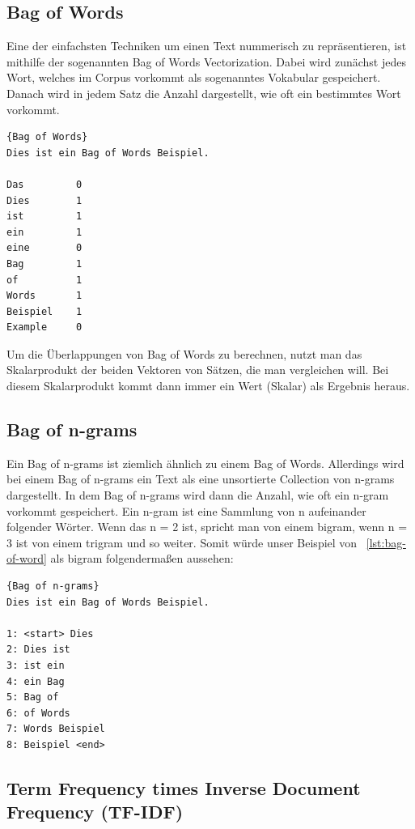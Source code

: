 \subsection{Bag of Words}

Eine der einfachsten Techniken um einen Text nummerisch zu repräsentieren, ist mithilfe der sogenannten Bag of Words Vectorization.
Dabei wird zunächst jedes Wort, welches im Corpus vorkommt als sogenanntes Vokabular gespeichert.
Danach wird in jedem Satz die Anzahl dargestellt, wie oft ein bestimmtes Wort vorkommt.\cite{textAnalysisMonkeylearn}

\begin{lstlisting}[label={lst:bag-of-word},caption={Bag of Words}]{Bag of Words}
Dies ist ein Bag of Words Beispiel.

Das         0
Dies        1
ist         1
ein         1
eine        0
Bag         1
of          1
Words       1
Beispiel    1
Example     0
\end{lstlisting}

Um die Überlappungen von Bag of Words zu berechnen, nutzt man das Skalarprodukt der beiden Vektoren von Sätzen, die man vergleichen will.
Bei diesem Skalarprodukt kommt dann immer ein Wert (Skalar) als Ergebnis heraus.


\subsection{Bag of n-grams}

Ein Bag of n-grams ist ziemlich ähnlich zu einem Bag of Words.
Allerdings wird bei einem Bag of n-grams ein Text als eine unsortierte Collection von n-grams dargestellt.
In dem Bag of n-grams wird dann die Anzahl, wie oft ein n-gram vorkommt gespeichert.
Ein n-gram ist eine Sammlung von n aufeinander folgender Wörter.
Wenn das n = 2 ist, spricht man von einem bigram, wenn n = 3 ist von einem trigram und so weiter.
Somit würde unser Beispiel von ~\ref{lst:bag-of-word} als bigram folgendermaßen aussehen:

\begin{lstlisting}[label={lst:bag-of-n-grams},caption={Bag of n-grams}]{Bag of n-grams}
Dies ist ein Bag of Words Beispiel.

1: <start> Dies
2: Dies ist
3: ist ein
4: ein Bag
5: Bag of
6: of Words
7: Words Beispiel
8: Beispiel <end>
\end{lstlisting}

\subsection{Term Frequency times Inverse Document Frequency (TF-IDF)}

